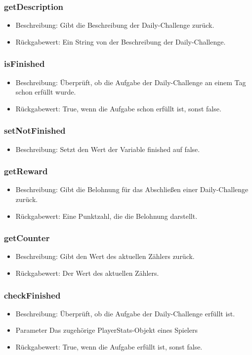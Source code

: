 \documentclass[a4paper]{scrreprt}
\begin{document}
	\subsubsection{getDescription}
	\begin{itemize}
		\item Beschreibung: Gibt die Beschreibung der Daily-Challenge zurück.
		\item Rückgabewert: Ein String von der Beschreibung der Daily-Challenge.
	\end{itemize}
	\subsubsection{isFinished}
	\begin{itemize}
		\item Beschreibung: Überprüft, ob die Aufgabe der Daily-Challenge an einem Tag schon erfüllt wurde.
		\item Rückgabewert: True, wenn die Aufgabe schon erfüllt ist, sonst false.
	\end{itemize}
	\subsubsection{setNotFinished}
	\begin{itemize}
		\item Beschreibung: Setzt den Wert der Variable finished auf false.
	\end{itemize}
	\subsubsection{getReward}
	\begin{itemize}
		\item Beschreibung: Gibt die Belohnung für das Abschließen einer Daily-Challenge zurück.
		\item Rückgabewert: Eine Punktzahl, die die Belohnung darstellt.
	\end{itemize}
	\subsubsection{getCounter}
	\begin{itemize}
		\item Beschreibung: Gibt den Wert des aktuellen Zählers zurück.
		\item Rückgabewert: Der Wert des aktuellen Zählers.
	\end{itemize}
	\subsubsection{checkFinished}
	\begin{itemize}
		\item Beschreibung: Überprüft, ob die Aufgabe der Daily-Challenge erfüllt ist.
		\item Parameter Das zugehörige PlayerStats-Objekt eines Spielers
		\item Rückgabewert: True, wenn die Aufgabe erfüllt ist, sonst false.
	\end{itemize}
	
\end{document}
